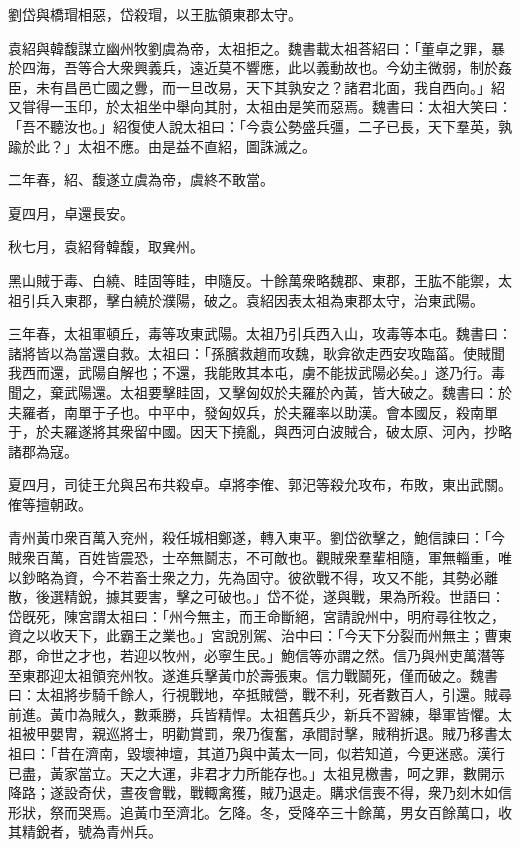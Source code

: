 \begin{pinyinscope}
劉岱與橋瑁相惡，岱殺瑁，以王肱領東郡太守。

袁紹與韓馥謀立幽州牧劉虞為帝，太祖拒之。魏書載太祖荅紹曰：「董卓之罪，暴於四海，吾等合大衆興義兵，遠近莫不響應，此以義動故也。今幼主微弱，制於姦臣，未有昌邑亡國之釁，而一旦改易，天下其孰安之？諸君北面，我自西向。」紹又甞得一玉印，於太祖坐中舉向其肘，太祖由是笑而惡焉。魏書曰：太祖大笑曰：「吾不聽汝也。」紹復使人說太祖曰：「今袁公勢盛兵彊，二子已長，天下羣英，孰踰於此？」太祖不應。由是益不直紹，圖誅滅之。

二年春，紹、馥遂立虞為帝，虞終不敢當。

夏四月，卓還長安。

秋七月，袁紹脅韓馥，取兾州。

黑山賊于毒、白繞、眭固等眭，申隨反。十餘萬衆略魏郡、東郡，王肱不能禦，太祖引兵入東郡，擊白繞於濮陽，破之。袁紹因表太祖為東郡太守，治東武陽。

三年春，太祖軍頓丘，毒等攻東武陽。太祖乃引兵西入山，攻毒等本屯。魏書曰：諸將皆以為當還自救。太祖曰：「孫臏救趙而攻魏，耿弇欲走西安攻臨菑。使賊聞我西而還，武陽自解也；不還，我能敗其本屯，虜不能拔武陽必矣。」遂乃行。毒聞之，棄武陽還。太祖要擊眭固，又擊匈奴於夫羅於內黃，皆大破之。魏書曰：於夫羅者，南單于子也。中平中，發匈奴兵，於夫羅率以助漢。會本國反，殺南單于，於夫羅遂將其衆留中國。因天下撓亂，與西河白波賊合，破太原、河內，抄略諸郡為寇。

夏四月，司徒王允與呂布共殺卓。卓將李傕、郭汜等殺允攻布，布敗，東出武關。傕等擅朝政。

青州黃巾衆百萬入兖州，殺任城相鄭遂，轉入東平。劉岱欲擊之，鮑信諫曰：「今賊衆百萬，百姓皆震恐，士卒無鬬志，不可敵也。觀賊衆羣輩相隨，軍無輜重，唯以鈔略為資，今不若畜士衆之力，先為固守。彼欲戰不得，攻又不能，其勢必離散，後選精銳，據其要害，擊之可破也。」岱不從，遂與戰，果為所殺。世語曰：岱旣死，陳宮謂太祖曰：「州今無主，而王命斷絕，宮請說州中，明府尋往牧之，資之以收天下，此霸王之業也。」宮說別駕、治中曰：「今天下分裂而州無主；曹東郡，命世之才也，若迎以牧州，必寧生民。」鮑信等亦謂之然。信乃與州吏萬潛等至東郡迎太祖領兖州牧。遂進兵擊黃巾於壽張東。信力戰鬬死，僅而破之。魏書曰：太祖將步騎千餘人，行視戰地，卒抵賊營，戰不利，死者數百人，引還。賊尋前進。黃巾為賊久，數乘勝，兵皆精悍。太祖舊兵少，新兵不習練，舉軍皆懼。太祖被甲嬰冑，親巡將士，明勸賞罰，衆乃復奮，承間討擊，賊稍折退。賊乃移書太祖曰：「昔在濟南，毀壞神壇，其道乃與中黃太一同，似若知道，今更迷惑。漢行已盡，黃家當立。天之大運，非君才力所能存也。」太祖見檄書，呵之罪，數開示降路；遂設奇伏，晝夜會戰，戰輙禽獲，賊乃退走。購求信喪不得，衆乃刻木如信形狀，祭而哭焉。追黃巾至濟北。乞降。冬，受降卒三十餘萬，男女百餘萬口，收其精銳者，號為青州兵。


\end{pinyinscope}
